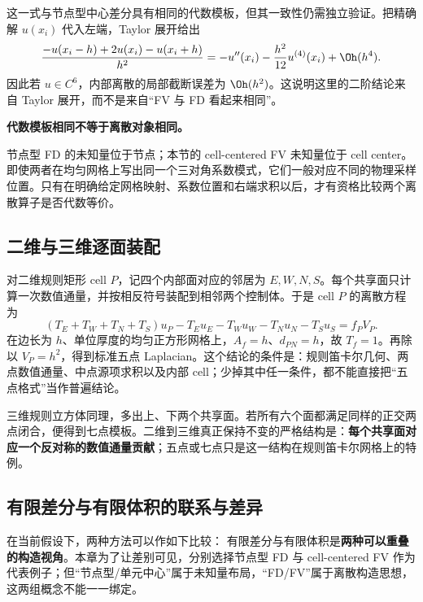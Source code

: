 这一式与节点型中心差分具有相同的代数模板，但其一致性仍需独立验证。把精确解 $u(x_i)$ 代入左端，Taylor 展开给出
\begin{equation}
\frac{-u(x_i-h)+2u(x_i)-u(x_i+h)}{h^2}
=-u''(x_i)-\frac{h^2}{12}u^{(4)}(x_i)+\Oh(h^4).
\end{equation}
因此若 $u\in C^6$，内部离散的局部截断误差为 $\Oh(h^2)$。这说明这里的二阶结论来自 Taylor 展开，而不是来自“FV 与 FD 看起来相同”。

\begin{warningbox}
\textbf{代数模板相同不等于离散对象相同。}

节点型 FD 的未知量位于节点；本节的 cell-centered FV 未知量位于 cell center。即使两者在均匀网格上写出同一个三对角系数模式，它们一般对应不同的物理采样位置。只有在明确给定网格映射、系数位置和右端求积以后，才有资格比较两个离散算子是否代数等价。
\end{warningbox}

\subsection{二维与三维逐面装配}

对二维规则矩形 cell $P$，记四个内部面对应的邻居为 $E,W,N,S$。每个共享面只计算一次数值通量，并按相反符号装配到相邻两个控制体。于是 cell $P$ 的离散方程为
\begin{equation}
\boxed{
\left(T_E+T_W+T_N+T_S\right)u_P
-T_Eu_E-T_Wu_W-T_Nu_N-T_Su_S
=f_PV_P.
}
\label{eq:discretization-fv-poisson-two-dimensional-row}
\end{equation}
在边长为 $h$、单位厚度的均匀正方形网格上，$A_f=h$、$d_{PN}=h$，故 $T_f=1$。再除以 $V_P=h^2$，得到标准五点 Laplacian。这个结论的条件是：规则笛卡尔几何、两点数值通量、中点源项求积以及内部 cell；少掉其中任一条件，都不能直接把“五点格式”当作普遍结论。

三维规则立方体同理，多出上、下两个共享面。若所有六个面都满足同样的正交两点闭合，便得到七点模板。二维到三维真正保持不变的严格结构是：\textbf{每个共享面对应一个反对称的数值通量贡献}；五点或七点只是这一结构在规则笛卡尔网格上的特例。

\subsection{有限差分与有限体积的联系与差异}

在当前假设下，两种方法可以作如下比较：
有限差分与有限体积是\textbf{两种可以重叠的构造视角}。本章为了让差别可见，分别选择节点型 FD 与 cell-centered FV 作为代表例子；但“节点型/单元中心”属于未知量布局，“FD/FV”属于离散构造思想，这两组概念不能一一绑定。

